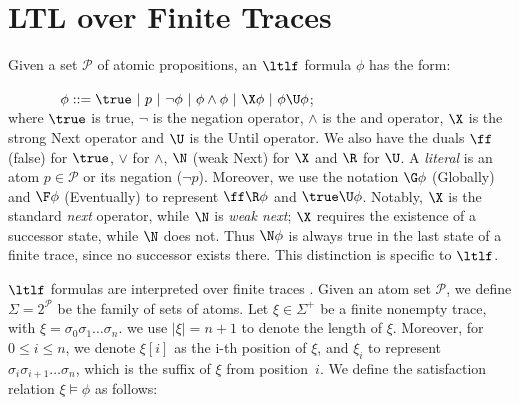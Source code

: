 

\section{LTL over Finite Traces}\label{sec:pre}
Given a set $\mathcal{P}$ of atomic propositions, an $\ltlf$ formula
$\phi$ has the form:

$\ \ \ \ \ \ \ \ \ \ \ \phi ::= \true\ |\ p\ |\ \neg \phi\ |\ \phi\wedge\phi\ |\ \X\phi\ |\ \phi \U\phi$;\\
%
where $\true$ is true, $\neg$ is the negation operator, $\wedge$ is the and operator, $\X$ is the strong Next operator 
and  $\U$ is the Until operator. We also have the duals $\ff$ (false) for $\true$, $\vee$ for $\wedge$, 
$\N$ (weak Next) for $\X$ and $\R$ for $\U$. A \emph{literal} is an atom $p\in\mathcal{P}$ or its negation ($\neg p$).
 Moreover, we use the notation $\G\phi$ (Globally) and $\F\phi$
(Eventually) to represent $\ff \R\phi$ and $\true \U\phi$.
Notably, $\X$ is the standard \emph{next} operator, while $\N$ is \emph{weak next}; 
$\X$ requires the existence of a successor state, while $\N$ does not. 
Thus $\N\phi$ is always true in the last state of a finite trace, since no successor exists there.
This distinction is specific to $\ltlf$.

$\ltlf$ formulas are interpreted over finite traces \cite{GV13}.
Given an atom set $\mathcal{P}$, we define $\Sigma = 2^{\mathcal{P}}$ be  the family of sets of atoms. Let
$\xi\in\Sigma^+$ be a finite nonempty trace, with $\xi=\sigma_0\sigma_1\ldots\sigma_n$. we use
$|\xi|=n+1$ to denote the length of $\xi$. Moreover, for $0\leq
i\leq n$, we denote $\xi[i]$ as the i-th position of $\xi$, and 
$\xi_i$ to represent $\sigma_i\sigma_{i+1}\ldots\sigma_n$, which is
the suffix of $\xi$ from position~$i$. We define the satisfaction relation $\xi\models\phi$ as follows:

